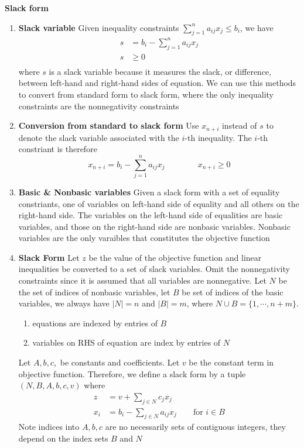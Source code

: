\documentclass[11pt]{article}
\begin{document}
\begin{defn*}
\end{defn*}


\begin{defn*}
    \textbf{Slack form}
    \begin{enumerate}
        \item \textbf{Slack variable} Given inequality constraints $\sum_{j=1}^n a_{ij} x_j \leq b_i$, we have  
        \begin{align*}
            s &= b_i - \sum_{j=1}^n a_{ij} x_j \\
            s &\geq 0 \\
        \end{align*}
        where $s$ is a slack variable because it measures the slack, or difference, between left-hand and right-hand sides of equation. We can use this methods to convert from standard form to slack form, where the only inequality constraints are the nonnegativity constraints 
        \item \textbf{Conversion from standard to slack form} Use $x_{n+i}$ instead of $s$ to denote the slack variable associated with the $i$-th inequality. The $i$-th constriant is therefore 
        \[
            x_{n+i} = b_i - \sum_{j=1}^n a_{ij} x_j \quad \quad \quad \quad x_{n+i}\geq 0
        \]
        \item \textbf{Basic \& Nonbasic variables} Given a slack form with a set of equality constriants, one of variables on left-hand side of equality and all others on the right-hand side. The variables on the left-hand side of equalities are basic variables, and those on the right-hand side are nonbasic variables. Nonbasic variables are the only varaibles that constitutes the objective function
        \item \textbf{Slack Form} Let $z$ be the value of the objective function and linear inequalities be converted to a set of slack variables. Omit the nonnegativity constraints since it is assumed that all variables are nonnegative. Let $N$ be the set of indices of nonbasic variables, let $B$ be set of indices of the basic variables, we always have $|N| = n$ and $|B| = m$, where $N\cup B = \{ 1,\cdots, n+m\}$. 
        \begin{enumerate}
            \item equations are indexed by entries of $B$
            \item variables on RHS of equation are index by entries of $N$
        \end{enumerate}
        Let $A,b,c,$ be constants and coefficients. Let $v$ be the constant term in objective function. Therefore, we define a slack form by a tuple $(N, B, A, b, c, v)$ where 
        \begin{align*}
            z &= v+ \sum_{j\in N} c_j x_j \\
            x_i &= b_i - \sum_{j\in N} a_{ij} x_j \quad\quad \text{for } i\in B
        \end{align*}
        Note indices into $A,b,c$ are no necessarily sets of contiguous integers, they depend on the index sets $B$ and $N$
        
    \end{enumerate}
\end{defn*}
\end{document}
